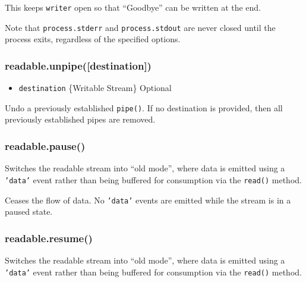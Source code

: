 This keeps \texttt{writer} open so that ``Goodbye'' can be written at
the end.

\begin{Shaded}
\begin{Highlighting}[]
\NormalTok{: } \NormalTok{\});}
\NormalTok{(}\NormalTok{, }\NormalTok{() \{}
  \NormalTok{(}\NormalTok{);}
\NormalTok{\});}
\end{Highlighting}
\end{Shaded}

Note that \texttt{process.stderr} and \texttt{process.stdout} are never
closed until the process exits, regardless of the specified options.

\subsubsection{readable.unpipe({[}destination{]})}

\begin{itemize}
\item
  \texttt{destination} \{Writable Stream\} Optional
\end{itemize}

Undo a previously established \texttt{pipe()}. If no destination is
provided, then all previously established pipes are removed.

\subsubsection{readable.pause()}

Switches the readable stream into ``old mode'', where data is emitted
using a \texttt{'data'} event rather than being buffered for consumption
via the \texttt{read()} method.

Ceases the flow of data. No \texttt{'data'} events are emitted while the
stream is in a paused state.

\subsubsection{readable.resume()}

Switches the readable stream into ``old mode'', where data is emitted
using a \texttt{'data'} event rather than being buffered for consumption
via the \texttt{read()} method.

